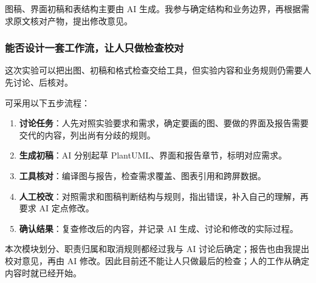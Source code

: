 图稿、界面初稿和表结构主要由 AI 生成。我参与确定结构和业务边界，再根据需求原文核对产物，提出修改意见。

\subsubsection{能否设计一套工作流，让人只做检查校对}

这次实验可以把出图、初稿和格式检查交给工具，但实验内容和业务规则仍需要人先讨论、后核对。

可采用以下五步流程：

\begin{enumerate}[leftmargin=3.2em]
  \item \textbf{讨论任务}：人先对照实验要求和需求，确定要画的图、要做的界面及报告需要交代的内容，列出尚有分歧的规则。
  \item \textbf{生成初稿}：AI 分别起草 PlantUML、界面和报告章节，标明对应需求。
  \item \textbf{工具核对}：编译图与报告，检查需求覆盖、图表引用和跨屏数据。
  \item \textbf{人工校改}：对照需求和图稿判断结构与规则，指出错误，补入自己的理解，再要求 AI 定点修改。
  \item \textbf{确认结果}：复查修改后的内容，并记录 AI 生成、讨论和修改的实际过程。
\end{enumerate}

本次模块划分、职责归属和取消规则都经过我与 AI 讨论后确定；报告也由我提出校对意见，再由 AI 修改。因此目前还不能让人只做最后的检查；人的工作从确定内容时就已经开始。
